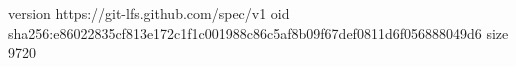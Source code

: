 version https://git-lfs.github.com/spec/v1
oid sha256:e86022835cf813e172c1f1c001988c86c5af8b09f67def0811d6f056888049d6
size 9720

